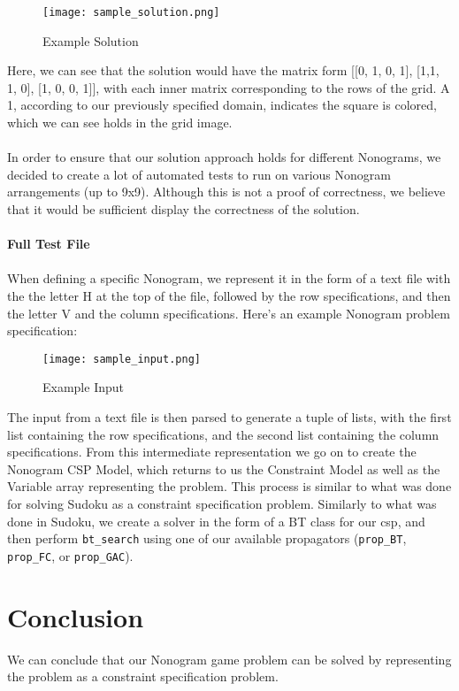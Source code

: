 \documentclass[titlepage]{article}
\begin{document}
\begin{figure}[ht!]
\centering
\texttt{[image: sample\_solution.png]}
\caption{Example Solution \label{overflow}}
\end{figure}

Here, we can see that the solution would have the matrix form [[0, 1, 0, 1], [1,1, 1, 0], [1, 0, 0, 1]], with each inner matrix corresponding to the rows of the grid. A 1, according to our previously specified domain, indicates the square is colored, which we can see holds in the grid image. \\\\


In order to ensure that our solution approach holds for different Nonograms, we decided to create a lot of automated tests to run on various Nonogram arrangements (up to 9x9). Although this is not a proof of correctness, we believe that it would be sufficient display the correctness of the solution. \\\\
\textbf{Full Test File}\\\\
When defining a specific Nonogram, we represent it in the form of a text file with the the letter H at the top of the file, followed by the row specifications, and then the letter V and the column specifications. Here's an example Nonogram problem specification:

\begin{figure}[ht!]
\centering
\texttt{[image: sample\_input.png]}
\caption{Example Input \label{overflow}}
\end{figure}

The input from a text file is then parsed to generate a tuple of lists, with the first list containing the row specifications, and the second list containing the column specifications. From this intermediate representation we go on to create the Nonogram CSP Model, which returns to us the Constraint Model as well as the Variable array representing the problem. This process is similar to what was done for solving Sudoku as a constraint specification problem. Similarly to what was done in Sudoku, we create a solver in the form of a BT class for our csp, and then perform \verb|bt_search| using one of our available propagators (\verb|prop_BT|, \verb|prop_FC|, or \verb|prop_GAC|).


\section{Conclusion}
We can conclude that our Nonogram game problem can be solved by representing the problem as a constraint specification problem.
\end{document}
